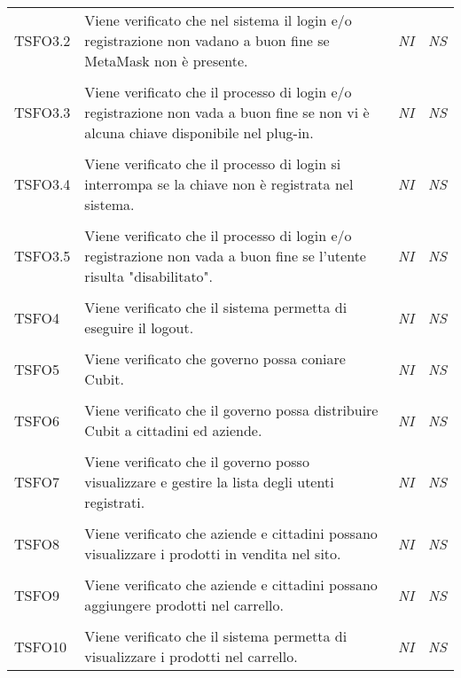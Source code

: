 \begin{longtable}{ >{\centering}p{} >{}p{}
			>{\centering}p{} >{\centering}p{}}
		\tabularnewline
		\hypertarget{TSFO3.2}{TSFO3.2} & Viene verificato che nel sistema il login e/o 
		registrazione non vadano a buon fine se MetaMask non è presente. & 
		\textit{NI} & \textit{NS}\\  

		\tabularnewline
		\hypertarget{TSFO3.3}{TSFO3.3} & Viene verificato che il processo di login e/o 
		registrazione non vada a buon fine se non vi è alcuna chiave disponibile nel 
		plug-in. & \textit{NI} & \textit{NS}\\ 

		\tabularnewline
		\hypertarget{TSFO3.4}{TSFO3.4} & Viene verificato che il processo di login si 
		interrompa se la chiave non è registrata nel sistema. & 
		\textit{NI} & \textit{NS}\\  

		\tabularnewline
		\hypertarget{TSFO3.5}{TSFO3.5} & Viene verificato che il processo di login e/o 
		registrazione non vada a buon fine se l'utente risulta "disabilitato". & 
		\textit{NI} & \textit{NS}\\ 

		\tabularnewline
		\hypertarget{TSFO4}{TSFO4} & Viene verificato che il sistema permetta di 
		eseguire il logout. & \textit{NI} & \textit{NS}\\ 

		\tabularnewline
		\hypertarget{TSFO5}{TSFO5} & Viene verificato che governo possa coniare Cubit. & 
		\textit{NI} & \textit{NS}\\ 

		\tabularnewline
		\hypertarget{TSFO6}{TSFO6} & Viene verificato che il governo possa distribuire 
		Cubit a cittadini ed aziende. & \textit{NI} & \textit{NS}\\ 

		\tabularnewline
		\hypertarget{TSFO7}{TSFO7} & Viene verificato che il governo posso visualizzare 
		e gestire la lista degli utenti registrati. & \textit{NI} & \textit{NS}\\ 

		\tabularnewline
		\hypertarget{TSFO8}{TSFO8} & Viene verificato che aziende e cittadini possano 
		visualizzare i prodotti in vendita nel sito. & \textit{NI} & \textit{NS}\\ 

		\tabularnewline
		\hypertarget{TSFO9}{TSFO9} & Viene verificato che aziende e cittadini possano 
		aggiungere prodotti nel carrello. & \textit{NI} & \textit{NS}\\ 

		\tabularnewline
		\hypertarget{TSFO10}{TSFO10} & Viene verificato che il sistema permetta di 
		visualizzare i prodotti nel carrello. & \textit{NI} & \textit{NS}\\ 


\end{longtable}

